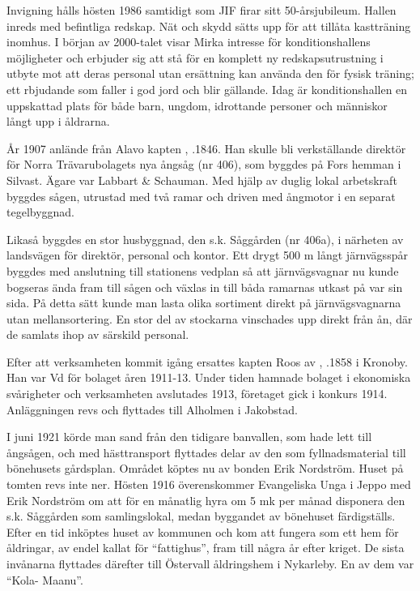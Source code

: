 Invigning hålls hösten 1986 samtidigt som JIF firar sitt 50-årsjubileum. Hallen inreds med befintliga redskap. Nät och skydd sätts upp för att tillåta kastträning inomhus. I början av 2000-talet visar Mirka intresse för konditionshallens möjligheter och erbjuder sig att stå för en komplett ny redskapsutrustning i utbyte mot att deras personal utan ersättning kan använda den för fysisk träning; ett rbjudande som faller i god jord och blir gällande. Idag är konditionshallen en uppskattad plats för både barn, ungdom, idrottande personer och människor långt upp i åldrarna.



%

\jhnooccupant

År 1907 anlände från Alavo kapten , .1846. Han skulle bli verkställande direktör för Norra Trävarubolagets nya ångsåg (nr 406), som byggdes på Fors hemman i Silvast. Ägare var Labbart \& Schauman. Med hjälp av duglig lokal arbetskraft byggdes sågen, utrustad med två ramar och driven med ångmotor i en separat tegelbyggnad.

Likaså byggdes en stor husbyggnad, den s.k. Såggården (nr 406a), i närheten av landsvägen för direktör, personal och kontor. Ett drygt 500 m långt järnvägsspår byggdes med anslutning till stationens vedplan så att järnvägsvagnar nu kunde bogseras ända fram till sågen och växlas in till båda ramarnas utkast på var sin sida. På detta sätt kunde man lasta olika sortiment direkt på järnvägsvagnarna utan mellansortering. En stor del av stockarna vinschades upp direkt från ån, där de samlats ihop av särskild personal.



Efter att verksamheten kommit igång ersattes kapten Roos av , .1858 i Kronoby. Han var Vd för bolaget åren 1911-13. Under tiden hamnade bolaget i ekonomiska svårigheter och verksamheten avslutades 1913, företaget gick i konkurs 1914. Anläggningen revs och flyttades till Alholmen i Jakobstad.

I juni 1921 körde man sand från den tidigare banvallen, som hade lett till ångsågen, och med hästtransport flyttades delar av den som fyllnadsmaterial till bönehusets gårdsplan. Området köptes nu av bonden Erik Nordström. Huset på tomten revs inte ner. Hösten 1916 överenskommer Evangeliska Unga i Jeppo med Erik Nordström  om att för en månatlig hyra om 5 mk per månad disponera den s.k. Såggården som samlingslokal, medan byggandet av bönehuset färdigställs. Efter en tid inköptes huset av kommunen och kom att fungera som ett hem för åldringar, av endel kallat för ``fattighus'', fram till några år efter kriget. De sista invånarna flyttades därefter till Östervall åldringshem i Nykarleby. En av dem var ``Kola- Maanu''.

